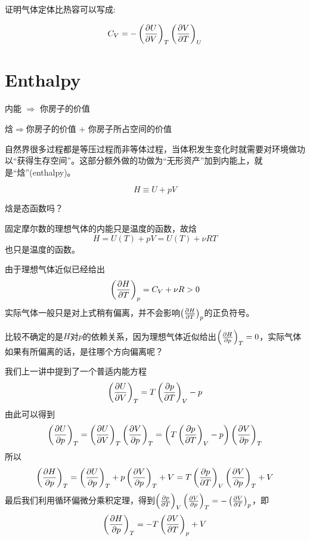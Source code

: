 \documentclass[CJK]{beamer}
\begin{document}
\begin{frame}
\bch
{}

证明气体定体比热容可以写成:

$$
C_V =  - \pfrac UVT \pfrac VTU 
$$

\ech
\end{frame}


\section{Enthalpy}

\begin{frame}
\bch

内能 $\Rightarrow$ 你房子的价值

焓$\Rightarrow$你房子的价值 + 你房子所占空间的价值

\skipline

自然界很多过程都是等压过程而非等体过程，当体积发生变化时就需要对环境做功以“获得生存空间”。这部分额外做的功做为“无形资产”加到内能上，就是“焓”(enthalpy)。

$$ H \equiv U + pV$$


\ech
\end{frame}

\begin{frame}
\bch
{}
焓是态函数吗？
\ech
\end{frame}


\begin{frame}
\bch
固定摩尔数的理想气体的内能只是温度的函数，故焓
$$H = U(T) + pV = U(T) + \nu R T$$
也只是温度的函数。
\ech
\end{frame}

\begin{frame}
\bch
由于理想气体近似已经给出
$$\pfrac HTp =  C_V+ \nu R > 0$$
实际气体一般只是对上式稍有偏离，并不会影响$\pfrac HTp $的正负符号。

比较不确定的是$H$对$p$的依赖关系，因为理想气体近似给出$\pfrac HpT = 0$，实际气体如果有所偏离的话，是往哪个方向偏离呢？
\ech
\end{frame}

\begin{frame}
\bch
{\small
我们上一讲中提到了一个普适内能方程{\blue
$$\pfrac UVT = T\pfrac pTV - p$$}
由此可以得到
$$\pfrac UpT = \pfrac UVT\pfrac VpT= \left(T\pfrac pTV - p\right) \pfrac VpT$$
所以
$$\pfrac HpT = \pfrac UpT  + p\pfrac VpT + V = T\pfrac pTV \pfrac VpT + V$$
最后我们利用循环偏微分乘积定理，得到$\pfrac pTV \pfrac VpT = - \pfrac VTp$，即
{\blue
$$\pfrac HpT = - T\pfrac VTp + V$$
}}
\ech
\end{frame}
\end{document}
